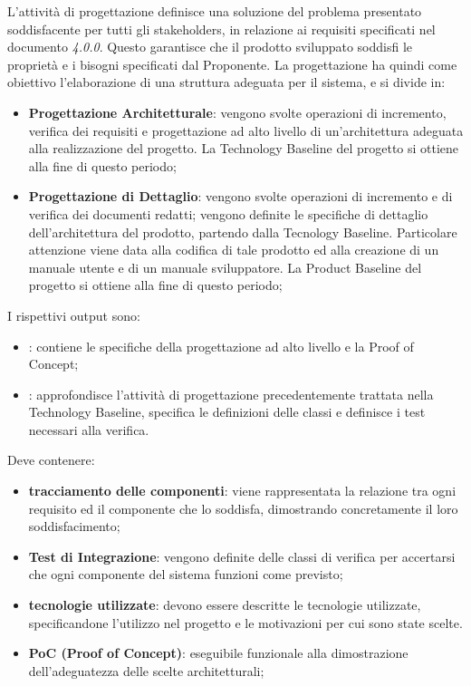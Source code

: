         L'attività di progettazione definisce una soluzione del problema presentato soddisfacente per tutti gli stakeholders, in relazione ai requisiti specificati nel documento \AdR{} \textit{4.0.0}. Questo garantisce che il prodotto sviluppato soddisfi le proprietà e i bisogni specificati dal Proponente.
        La progettazione ha quindi come obiettivo l'elaborazione di una struttura adeguata per il sistema, e si divide in:
        \begin{itemize}
        	\item{\textbf{Progettazione Architetturale}}: vengono svolte operazioni di incremento, verifica dei requisiti e progettazione ad alto livello di un'architettura adeguata alla realizzazione del progetto. La Technology Baseline del progetto si ottiene alla fine di questo periodo;
        	\item{\textbf{Progettazione di Dettaglio}}: vengono svolte operazioni di incremento e di verifica dei documenti redatti; vengono definite le specifiche di dettaglio dell'architettura del prodotto, partendo dalla Tecnology Baseline. Particolare attenzione viene data alla codifica di tale prodotto ed alla creazione di un manuale utente e di un manuale sviluppatore. La Product Baseline del progetto si ottiene alla fine di questo periodo;
        \end{itemize}
    	I rispettivi output sono:
        \begin{itemize}
           	\item{\textbf{\TB{}}: contiene le specifiche della progettazione ad alto livello e la Proof of Concept;}
			\item{\textbf{\PB{}}: approfondisce l'attività di progettazione precedentemente trattata nella Technology Baseline, specifica le definizioni delle classi e definisce i test necessari alla verifica.}
   		\end{itemize}

  Deve contenere:
  \begin{itemize}
		\item \textbf{tracciamento delle componenti}: viene rappresentata la relazione tra ogni requisito ed il componente che lo soddisfa, dimostrando concretamente il loro soddisfacimento;
		\item \textbf{Test di Integrazione}: vengono definite delle classi di verifica per accertarsi che ogni componente del sistema funzioni come previsto;
		\item \textbf{tecnologie utilizzate}: devono essere descritte le tecnologie utilizzate, specificandone l'utilizzo nel progetto e le motivazioni per cui sono state scelte.
		\item \textbf{PoC (Proof of Concept)}: eseguibile funzionale alla dimostrazione dell'adeguatezza delle scelte architetturali;
  \end{itemize}

